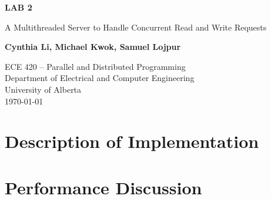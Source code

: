 \documentclass{article}
\begin{document}
\begin{titlepage}
    \begin{center}
        \vspace*{1cm}

        \textbf{\Large{LAB 2}}

        \vspace{0.5cm}

        \LARGE{A Multithreaded Server to Handle Concurrent Read and Write Requests}

        \vspace{1.5cm}

        \textbf{\Large{Cynthia Li, Michael Kwok, Samuel Lojpur}}

        \vfill

        ECE 420 -- Parallel and Distributed Programming\\
        Department of Electrical and Computer Engineering\\
        University of Alberta\\
        \today

    \end{center}
\end{titlepage}

\tableofcontents
\listoffigures
\listoftables

\pagebreak

\section{Description of Implementation}


\section{Performance Discussion}


\end{document}
